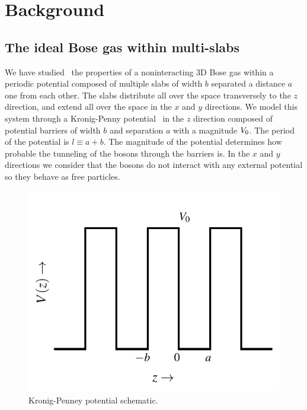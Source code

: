 \chapter{Background}%
\label{chap:background}


\section{The ideal Bose gas within multi-slabs}%
\label{sec:the-ideal-bose-gas-within-a-kronig-penney-potential}

We have studied~\cite{bib:rodriguez-msc-thesis.2014,
	bib:rodriguez-j-low-temp-phys.175.2014,
	bib:rodriguez-j-low-temp-phys.183.2016} the properties of a noninteracting 3D
Bose gas within a periodic potential composed of multiple slabs of width $b$
separated a distance $a$ one from each other. The slabs distribute all over
the space transversely to the $z$ direction, and extend all over the space in
the $x$ and $y$ directions. We model this system through a Kronig-Penny
potential~\cite{bib:kronig-proc-roy-soc-lond.130.1931} in the $z$ direction
composed of potential barriers of width $b$ and separation $a$ with a
magnitude ${V_0}$. The period of the potential is $l \equiv a + b$. The magnitude
of the potential determines how probable the tunneling of the bosons through
the barriers is. In the $x$ and $y$ directions we consider that the bosons do
not interact with any external potential so they behave as free particles.
%
\begin{figure}[h!]
	\centering
	\includegraphics[width=0.6\linewidth]{./figures/kp-potential}
	\caption{Kronig-Penney potential schematic.}\label{fig:kp-potential}
\end{figure}
%

